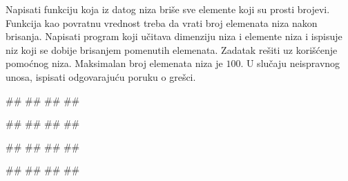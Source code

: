 \begin{Exercise}[label=p.izbacivanje_prostih_elemenata] 
Napisati funkciju koja iz datog niza briše sve elemente koji su prosti brojevi. 
Funkcija kao povratnu vrednost treba da vrati broj elemenata niza nakon brisanja. 
Napisati program koji učitava dimenziju niza i elemente niza i ispisuje niz koji se dobije 
brisanjem pomenutih elemenata. Zadatak rešiti uz korišćenje pomoćnog niza.
Maksimalan broj elemenata niza je $100$.
U slučaju neispravnog unosa, ispisati odgovarajuću poruku o grešci. 

\begin{miditest}
\begin{upotreba}{1}
#\naslovInt#
##
##
##
\end{upotreba}
\end{miditest}
\begin{miditest}
\begin{upotreba}{2}
#\naslovInt#
##
##
##
\end{upotreba}
\end{miditest}

\begin{miditest}
\begin{upotreba}{3}
#\naslovInt#
##
##
##
\end{upotreba}
\end{miditest}
\begin{miditest}
\begin{upotreba}{4}
#\naslovInt#
##
##
##
\end{upotreba}
\end{miditest}
\end{Exercise}

\ifresenja
\begin{Answer}[ref=p.izbacivanje_prostih_elemenata]
\end{Answer}
\fi


